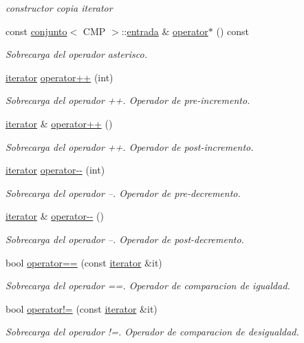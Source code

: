 \begin{DoxyCompactItemize}
\begin{DoxyCompactList}\small\item\em constructor copia iterator \end{DoxyCompactList}\item 
const \hyperlink{classconjunto}{conjunto}$<$ C\-M\-P $>$\-::\hyperlink{classconjunto_a7630ace7cb17bcec07daf5804f1a0780}{entrada} \& \hyperlink{classconjunto_1_1iterator_a0c53f65ff17cb959685cf42128da0520}{operator$\ast$} () const 
\begin{DoxyCompactList}\small\item\em Sobrecarga del operador asterisco. \end{DoxyCompactList}\item 
\hyperlink{classconjunto_1_1iterator}{iterator} \hyperlink{classconjunto_1_1iterator_aaa2face7f36e8940595dc6f0e1159865}{operator++} (int)
\begin{DoxyCompactList}\small\item\em Sobrecarga del operador ++. Operador de pre-\/incremento. \end{DoxyCompactList}\item 
\hyperlink{classconjunto_1_1iterator}{iterator} \& \hyperlink{classconjunto_1_1iterator_a5bf3aeb06e1fe0124b1d42cd0da7ed35}{operator++} ()
\begin{DoxyCompactList}\small\item\em Sobrecarga del operador ++. Operador de post-\/incremento. \end{DoxyCompactList}\item 
\hyperlink{classconjunto_1_1iterator}{iterator} \hyperlink{classconjunto_1_1iterator_a65e3c7bd6184521188929ba84a791f6e}{operator-\/-\/} (int)
\begin{DoxyCompactList}\small\item\em Sobrecarga del operador --. Operador de pre-\/decremento. \end{DoxyCompactList}\item 
\hyperlink{classconjunto_1_1iterator}{iterator} \& \hyperlink{classconjunto_1_1iterator_af3e2b478f383e17b5e5b4775ef1bdc04}{operator-\/-\/} ()
\begin{DoxyCompactList}\small\item\em Sobrecarga del operador --. Operador de post-\/decremento. \end{DoxyCompactList}\item 
bool \hyperlink{classconjunto_1_1iterator_af6f2f2d74883c198c3b1d89cfb14736a}{operator==} (const \hyperlink{classconjunto_1_1iterator}{iterator} \&it)
\begin{DoxyCompactList}\small\item\em Sobrecarga del operador ==. Operador de comparacion de igualdad. \end{DoxyCompactList}\item 
bool \hyperlink{classconjunto_1_1iterator_af95f417783c284187af6dedc5ed45a64}{operator!=} (const \hyperlink{classconjunto_1_1iterator}{iterator} \&it)
\begin{DoxyCompactList}\small\item\em Sobrecarga del operador !=. Operador de comparacion de desigualdad. \end{DoxyCompactList}\end{DoxyCompactItemize}
